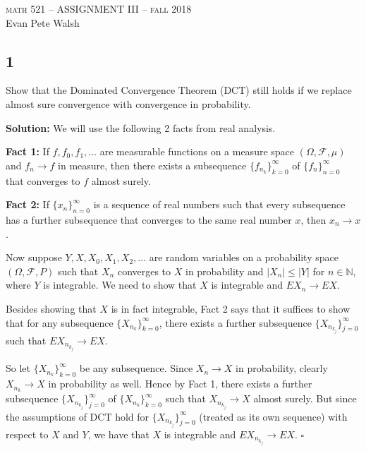 \documentclass[12pt]{article}
\newcounter{ProofCounter}
\newenvironment{Solution}{\stepcounter{ProofCounter}\textbf{Solution:}}{\hfill$\square$}
\begin{document}
\thispagestyle{empty}
\begin{center}
  \Large \textsc{math 521 -- ASSIGNMENT III -- fall 2018} \\ 
  \vspace{5mm}
  \large Evan Pete Walsh
\end{center}



\subsection*{1}
\begin{tcolorbox}
  Show that the Dominated Convergence Theorem (DCT) still holds if we replace almost sure convergence with convergence in probability.
\end{tcolorbox}
\begin{Solution}
  We will use the following 2 facts from real analysis.

  \textbf{Fact 1:} If $f, f_0, f_1, \dots$ are measurable functions on a measure space $(\Omega, \mathcal{F}, \mu)$ and $f_n \rightarrow f$ in measure, then there exists a subsequence $\{ f_{n_k} \}_{k=0}^{\infty}$ of $\{ f_n \}_{n=0}^{\infty}$ that converges to $f$ almost surely.

  \textbf{Fact 2:} If $\{ x_n \}_{n=0}^{\infty}$ is a sequence of real numbers such that every subsequence has a further subsequence that converges to the same real number $x$, then $x_n \rightarrow x$.

  Now suppose $Y, X, X_0, X_1, X_2, \dots$ are random variables on a probability space $(\Omega, \mathcal{F}, P)$ such that $X_n$ converges to $X$ in probability and $|X_n| \leq |Y|$ for $n \in \mathbb{N}$, where $Y$ is integrable. We need to show that $X$ is integrable and $EX_n \rightarrow EX$.
  
  Besides showing that $X$ is in fact integrable, Fact 2 says that it suffices to show that for any subsequence $\{ X_{n_k} \}_{k=0}^{\infty}$, there exists a further subsequence $\{ X_{n_{k_j}} \}_{j=0}^{\infty}$ such that $EX_{n_{k_j}} \rightarrow EX$.

  So let $\{ X_{n_k} \}_{k=0}^{\infty}$ be any subsequence. Since $X_n \rightarrow X$ in probability, clearly $X_{n_k} \rightarrow X$ in probability as well. Hence by Fact 1, there exists a further subsequence $\{ X_{n_{k_j}} \}_{j=0}^{\infty}$ of $\{ X_{n_k} \}_{k=0}^{\infty}$ such that $X_{n_{k_j}} \rightarrow X$ almost surely.
  But since the assumptions of DCT hold for $\{ X_{n_{k_j}} \}_{j=0}^{\infty}$ (treated as its own sequence) with respect to $X$ and $Y$, we have that $X$ is integrable and $EX_{n_{k_j}} \rightarrow EX$.
\end{Solution}
\end{document}
